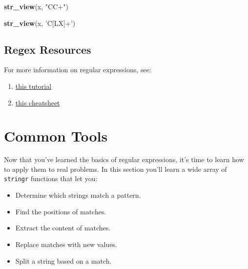 \documentclass[]{book}
\newenvironment{Shaded}{\begin{snugshade}}{\end{snugshade}}
\newcommand{\KeywordTok}[1]{\textcolor[rgb]{0.13,0.29,0.53}{\textbf{#1}}}
\newcommand{\NormalTok}[1]{#1}
\newcommand{\StringTok}[1]{\textcolor[rgb]{0.31,0.60,0.02}{#1}}
\providecommand{\tightlist}{%
  \setlength{\itemsep}{0pt}\setlength{\parskip}{0pt}}
\begin{document}
\hypertarget{htmlwidget-416566eb193bf50d04e6}{}

\begin{Shaded}
\begin{Highlighting}[]
\KeywordTok{str_view}\NormalTok{(x, }\StringTok{"CC+"}\NormalTok{)}
\end{Highlighting}
\end{Shaded}

\hypertarget{htmlwidget-72cbf064100ce560a04c}{}

\begin{Shaded}
\begin{Highlighting}[]
\KeywordTok{str_view}\NormalTok{(x, }\StringTok{'C[LX]+'}\NormalTok{)}
\end{Highlighting}
\end{Shaded}

\hypertarget{htmlwidget-d11fc4360aa0230696d7}{}

\hypertarget{regex-resources}{%
\subsection{Regex Resources}\label{regex-resources}}

For more information on regular expressions, see:

\begin{enumerate}
\def\labelenumi{\arabic{enumi}.}
\tightlist
\item
  \href{http://regextutorials.com/}{this tutorial}
\item
  \href{https://medium.com/factory-mind/regex-tutorial-a-simple-cheatsheet-by-examples-649dc1c3f285}{this cheatsheet}
\end{enumerate}

\hypertarget{common-tools}{%
\section{Common Tools}\label{common-tools}}

Now that you've learned the basics of regular expressions, it's time to learn how to apply them to real problems. In this section you'll learn a wide array of \texttt{stringr} functions that let you:

\begin{itemize}
\tightlist
\item
  Determine which strings match a pattern.
\item
  Find the positions of matches.
\item
  Extract the content of matches.
\item
  Replace matches with new values.
\item
  Split a string based on a match.
\end{itemize}
\end{document}
